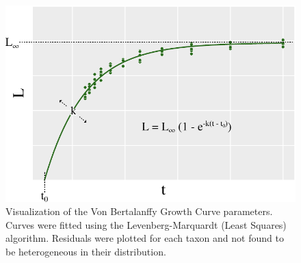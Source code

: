 \documentclass{article}
\begin{document}
 
  \begin{figure}[!ht]
    \includegraphics[width=\textwidth]{6}
    \caption{\footnotesize Visualization of the Von Bertalanffy Growth Curve parameters. Curves were fitted using the Levenberg-Marquardt (Least Squares) algorithm. Residuals were plotted for each taxon and not found to be heterogeneous in their distribution.}
    \label{fig:vbgf}
  \end{figure}


  \printbibliography
\end{document}
